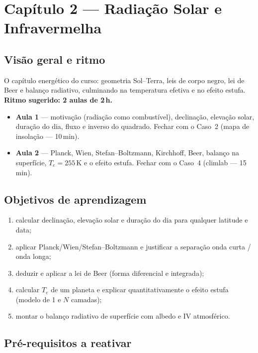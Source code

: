 \section{Capítulo 2 --- Radiação Solar e Infravermelha}

\subsection*{Visão geral e ritmo}

O capítulo energético do curso: geometria Sol--Terra, leis de corpo negro,
lei de Beer e balanço radiativo, culminando na temperatura efetiva e no
efeito estufa. \textbf{Ritmo sugerido: 2 aulas de 2\,h.}

\begin{itemize}
  \item \textbf{Aula 1} — motivação (radiação como combustível), declinação,
        elevação solar, duração do dia, fluxo e inverso do quadrado.
        Fechar com o Caso~2 (mapa de insolação — 10\,min).
  \item \textbf{Aula 2} — Planck, Wien, Stefan--Boltzmann, Kirchhoff, Beer,
        balanço na superfície, $T_e = 255$\,K e o efeito estufa.
        Fechar com o Caso~4 (climlab — 15\,min).
\end{itemize}

\subsection*{Objetivos de aprendizagem}

\begin{enumerate}
  \item calcular declinação, elevação solar e duração do dia para qualquer
        latitude e data;
  \item aplicar Planck/Wien/Stefan--Boltzmann e justificar a separação
        onda curta / onda longa;
  \item deduzir e aplicar a lei de Beer (forma diferencial e integrada);
  \item calcular $T_e$ de um planeta e explicar quantitativamente o efeito
        estufa (modelo de 1 e $N$ camadas);
  \item montar o balanço radiativo de superfície com albedo e IV atmosférico.
\end{enumerate}

\subsection*{Pré-requisitos a reativar}


